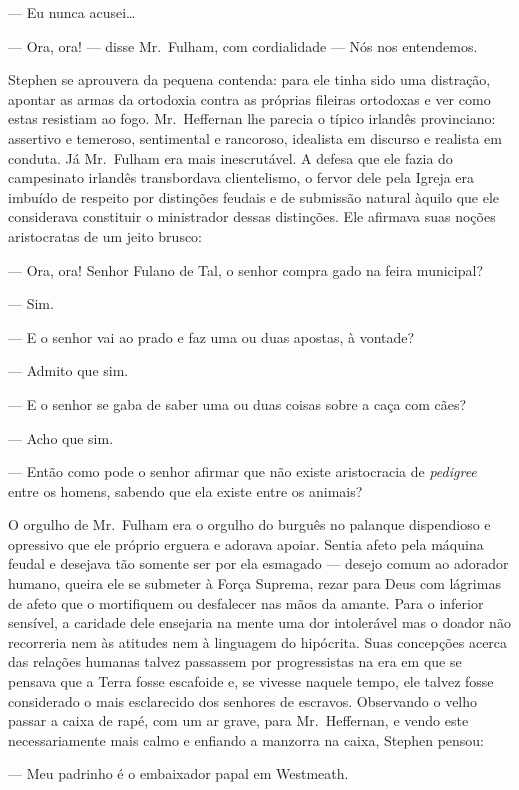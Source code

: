 --- Eu nunca acusei\ldots{}

--- Ora, ora! --- disse Mr.~Fulham, com cordialidade --- Nós nos
entendemos.

Stephen se aprouvera da pequena contenda: para ele tinha sido uma
distração, apontar as armas da ortodoxia contra as próprias fileiras
ortodoxas e ver como estas resistiam ao fogo.  Mr.~Heffernan lhe
parecia o típico irlandês provinciano: assertivo e temeroso,
sentimental e rancoroso, idealista em discurso e realista em conduta. 
Já Mr.~Fulham era mais inescrutável.  A defesa que ele fazia do
campesinato irlandês transbordava clientelismo, o fervor dele pela
Igreja era imbuído de respeito por distinções feudais e de submissão
natural àquilo que ele considerava constituir o ministrador dessas
distinções.  Ele afirmava suas noções aristocratas de um jeito brusco:

--- Ora, ora!  Senhor Fulano de Tal, o senhor compra gado na
feira municipal?

--- Sim.

--- E o senhor vai ao prado e faz uma ou duas apostas, à vontade?

--- Admito que sim.

--- E o senhor se gaba de saber uma ou duas coisas sobre a caça
com cães?

--- Acho que sim.

--- Então como pode o senhor afirmar que não existe aristocracia
de \textit{pedigree} entre os homens, sabendo que ela existe entre os
animais?

O orgulho de Mr.~Fulham era o orgulho do burguês no palanque
dispendioso e opressivo que ele próprio erguera e adorava apoiar. 
Sentia afeto pela máquina feudal e desejava tão somente ser por ela
esmagado --- desejo comum ao adorador humano, queira ele se submeter à
Força Suprema, rezar para Deus com lágrimas de afeto que o mortifiquem
ou desfalecer nas mãos da amante.  Para o inferior sensível, a caridade
dele ensejaria na mente uma dor intolerável mas o doador não recorreria
nem às atitudes nem à linguagem do hipócrita.  Suas concepções acerca
das relações humanas talvez passassem por progressistas na era em que
se pensava que a Terra fosse escafoide e, se vivesse naquele tempo, ele		
talvez fosse considerado o mais esclarecido dos senhores de
escravos.  Observando o velho passar a caixa de rapé, com um ar grave,
para Mr.~Heffernan, e vendo este necessariamente mais calmo e enfiando
a manzorra na caixa, Stephen pensou:

--- Meu padrinho é o embaixador papal em Westmeath.

